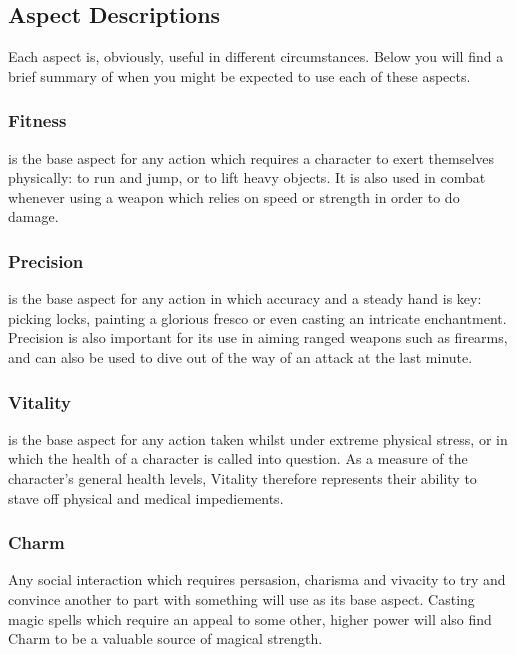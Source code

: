 \subsection{Aspect Descriptions}

Each aspect is, obviously, useful in different circumstances. Below you will find a brief summary of when you might be expected to use each of these aspects.

\subsubsection{Fitness}

 is the base aspect for any action which requires a character to exert themselves physically: to run and jump, or to lift heavy objects. It is also used in combat whenever using a weapon which relies on speed or strength in order to do damage.


\subsubsection{Precision}

 is the base aspect for any action in which accuracy and a steady hand is key: picking locks, painting a glorious fresco or even casting an intricate enchantment. Precision is also important for its use in aiming ranged weapons such as firearms, and can also be used to dive out of the way of an attack at the last minute. 


\subsubsection{Vitality}

 is the base aspect for any action taken whilst under extreme physical stress, or in which the health of a character is called into question. As a measure of the character's general health levels, Vitality therefore represents their ability to stave off physical and medical impediements. 


\subsubsection{Charm} 

Any social interaction which requires persasion, charisma and vivacity to try and convince another to part with something will use  as its base aspect.  Casting magic spells which require an appeal to some other, higher power will also find Charm to be a valuable source of magical strength. 


